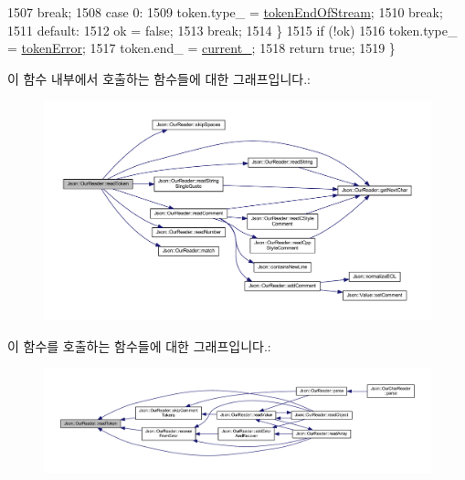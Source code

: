 \begin{DoxyCode}
1507     \textcolor{keywordflow}{break};
1508   \textcolor{keywordflow}{case} 0:
1509     token.type\_ = \hyperlink{class_json_1_1_our_reader_a15116f7276ddf1e7a2cc3cbefa884dcca735d1f76eafc2c0c581ed79c077aaa7e}{tokenEndOfStream};
1510     \textcolor{keywordflow}{break};
1511   \textcolor{keywordflow}{default}:
1512     ok = \textcolor{keyword}{false};
1513     \textcolor{keywordflow}{break};
1514   \}
1515   \textcolor{keywordflow}{if} (!ok)
1516     token.type\_ = \hyperlink{class_json_1_1_our_reader_a15116f7276ddf1e7a2cc3cbefa884dccad39f929b971de8dc55fe84a2d2e3465e}{tokenError};
1517   token.end\_ = \hyperlink{class_json_1_1_our_reader_a5211fbbba94be80a22dd2317c621efcc}{current\_};
1518   \textcolor{keywordflow}{return} \textcolor{keyword}{true};
1519 \}
\end{DoxyCode}
이 함수 내부에서 호출하는 함수들에 대한 그래프입니다.\+:\nopagebreak
\begin{figure}[H]
\begin{center}
\leavevmode
\includegraphics[width=350pt]{class_json_1_1_our_reader_a0d1e66da47fe2e85f5033c59326dfdc3_cgraph}
\end{center}
\end{figure}
이 함수를 호출하는 함수들에 대한 그래프입니다.\+:\nopagebreak
\begin{figure}[H]
\begin{center}
\leavevmode
\includegraphics[width=350pt]{class_json_1_1_our_reader_a0d1e66da47fe2e85f5033c59326dfdc3_icgraph}
\end{center}
\end{figure}
\mbox{\label{class_json_1_1_our_reader_a1765d9670d191c89a57a22ea5591d35f}} 
